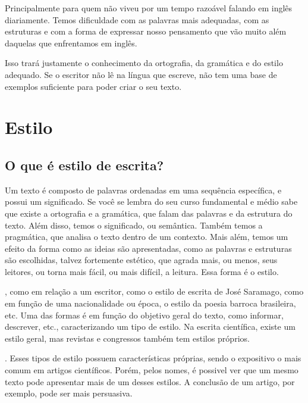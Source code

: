 \documentclass[openany]{book}
\begin{document}
 Principalmente para quem não viveu por um tempo razoável falando em inglês diariamente. Temos dificuldade com as palavras mais adequadas, com as estruturas e com a forma de expressar nosso pensamento que vão muito além daquelas que enfrentamos em inglês.

 Isso trará justamente o conhecimento da ortografia, da gramática e do estilo adequado. Se o escritor não lê na língua que escreve, não tem uma base de exemplos suficiente para poder criar o seu texto.


\chapter{Estilo}

\section{O que é estilo de escrita?}

 Um texto é composto de palavras ordenadas em uma sequência específica, e possui um significado. Se você se lembra do seu curso fundamental e médio sabe que existe a ortografia e a gramática, que falam das palavras e da estrutura do texto. Além disso, temos o significado, ou semântica. Também temos a pragmática, que analisa o texto dentro de um contexto. Mais além, temos um efeito da forma como as ideias são apresentadas, como as palavras e estruturas são escolhidas, talvez fortemente estético, que agrada mais, ou menos, seus leitores, ou torna mais fácil, ou mais difícil, a leitura. Essa forma é o estilo.

, como em relação a um escritor, como o estilo de escrita de José Saramago, como em função de uma nacionalidade ou época, o estilo da poesia barroca brasileira, etc. Uma das formas é em função do objetivo geral do texto, como informar, descrever, etc., caracterizando um tipo de estilo. Na escrita científica, existe um estilo geral, mas revistas e congressos também tem estilos próprios.

\citep{jeffrey:2016}. Esses tipos de estilo possuem características próprias, sendo o expositivo o mais comum em artigos científicos. Porém, pelos nomes, é possivel ver que um mesmo texto pode apresentar mais de um desses estilos. A conclusão de um artigo, por exemplo, pode ser mais persuasiva.
\end{document}
